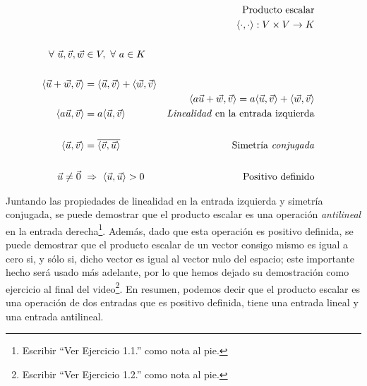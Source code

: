 \documentclass[12pt,dvipsnames]{article}
\numberwithin{equation}{section}
\begin{document}
\begin{align*}
    & &\text{Producto escalar}& &\\
    & &\langle\cdot,\cdot\rangle:V\times V\to K & &\\
    \\
    \forall \ \vec{u}, \vec{v}, \vec{w}&\in V, \ \forall \ a\in K\\
    \\
    \langle\vec{u}+\vec{w},\vec{v}\rangle &= \langle \vec{u} , \vec{v} \rangle + \langle \vec{w} , \vec{v} \rangle \\
                                          & &\langle a\vec{u}+\vec{w} , \vec{v} \rangle = a \langle \vec{u} , \vec{v} \rangle + \langle \vec{w} , \vec{v} \rangle\\
    \langle a\vec{u} , \vec{v} \rangle &= a \langle \vec{u} , \vec{v} \rangle &\text{\emph{Linealidad} en la  entrada izquierda} \\
    \\
    \langle \vec{u} , \vec{v} \rangle &= \overline{ \langle \vec{v} , \vec{u} \rangle} &\text{Simetría \emph{conjugada}}\\
    \\
    \vec{u}\neq\vec{0} \ &\Rightarrow \ \langle \vec{u}, \vec{u} \rangle > 0
 &\text{Positivo definido}
\end{align*}

\noindent Juntando las propiedades de linealidad en la entrada izquierda y simetría conjugada, se puede demostrar que el producto escalar es una operación \emph{antilineal} en la entrada derecha\footnote{Escribir ``Ver Ejercicio 1.1.'' como nota al pie.}. Además, dado que esta operación es positivo definida, se puede demostrar que el producto escalar de un vector consigo mismo es igual a cero si, y sólo si, dicho vector es igual al vector nulo del espacio; este importante hecho será usado más adelante, por lo que hemos dejado su demostración como ejercicio al final del video\footnote{Escribir ``Ver Ejercicio 1.2.'' como nota al pie.}. En resumen, podemos decir que el producto escalar es una operación de dos entradas que es positivo definida, tiene una entrada lineal y una entrada antilineal.
\end{document}
